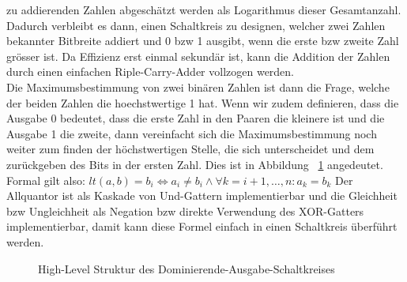 \documentclass{article}
\begin{document}
zu addierenden Zahlen abgesch\"atzt werden als Logarithmus dieser
Gesamtanzahl.\\
Dadurch verbleibt es dann, einen Schaltkreis zu designen, welcher zwei
Zahlen bekannter Bitbreite addiert und 0 bzw 1 ausgibt, wenn die erste
bzw zweite Zahl gr\"osser ist.
Da Effizienz erst einmal sekund\"ar ist, kann die Addition der Zahlen
 durch einen einfachen Riple-Carry-Adder vollzogen werden.\\
Die Maximumsbestimmung von zwei bin\"aren Zahlen ist dann die Frage,
 welche der beiden Zahlen die hoechstwertige 1 hat.
Wenn wir zudem definieren, dass die Ausgabe 0 bedeutet, dass die erste
 Zahl in den Paaren die kleinere ist und die Ausgabe 1 die zweite, dann
 vereinfacht sich die Maximumsbestimmung noch weiter zum finden der
 h\"ochstwertigen Stelle, die sich unterscheidet und dem zur\"uckgeben
 des Bits in der ersten Zahl. Dies ist in Abbildung ~\ref{fig:circuit:max sum}
 angedeutet.\\
Formal gilt also:
 \(lt(a, b) = b_i \Leftrightarrow a_i \neq b_i \wedge \forall k = i+1,\dots,n: a_k = b_k\)
Der Allquantor ist als Kaskade von Und-Gattern implementierbar und die Gleichheit
 bzw Ungleichheit als Negation bzw direkte Verwendung des XOR-Gatters implementierbar,
 damit kann diese Formel einfach in einen Schaltkreis \"uberf\"uhrt werden.
\begin{figure}[htb]
\centering
{}
\caption{High-Level Struktur des Dominierende-Ausgabe-Schaltkreises}
\label{fig:circuit:max sum}
\end{figure}
\end{document}
